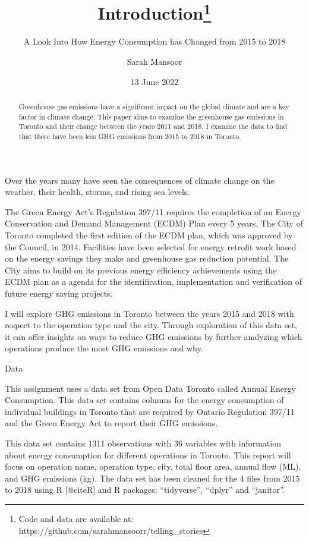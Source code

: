 \documentclass[
  letterpaper,
  DIV=11,
  numbers=noendperiod]{scrartcl}
\title{Introduction\thanks{Code and data are available at:
https://github.com/sarahmansoorr/telling\_stories}}
\subtitle{A Look Into How Energy Consumption has Changed from 2015 to
2018}
\author{Sarah Mansoor}
\date{13 June 2022}
\renewcommand*\contentsname{Table of contents}
\newcommand\contentsname{Table of contents}
\begin{document}
\maketitle
\begin{abstract}
Greenhouse gas emissions have a significant impact on the global climate
and are a key factor in climate change. This paper aims to examine the
greenhouse gas emissions in Toronto and their change between the years
2011 and 2018. I examine the data to find that there have been less GHG
emissions from 2015 to 2018 in Toronto.
\end{abstract}
\ifdefined\Shaded\renewenvironment{Shaded}{\begin{tcolorbox}[interior hidden, boxrule=0pt, enhanced, borderline west={3pt}{0pt}{shadecolor}, frame hidden, sharp corners, breakable]}{\end{tcolorbox}}\fi

\renewcommand*\contentsname{Table of contents}
{
\hypersetup{linkcolor=}
\setcounter{tocdepth}{3}
\tableofcontents
}
Over the years many have seen the consequences of climate change on the
weather, their health, storms, and rising sea levels.

The Green Energy Act's Regulation 397/11 requires the completion of an
Energy Conservation and Demand Management (ECDM) Plan every 5 years. The
City of Toronto completed the first edition of the ECDM plan, which was
approved by the Council, in 2014. Facilities have been selected for
energy retrofit work based on the energy savings they make and
greenhouse gas reduction potential. The City aims to build on its
previous energy efficiency achievements using the ECDM plan as a agenda
for the identification, implementation and verification of future energy
saving projects.

I will explore GHG emissions in Toronto between the years 2015 and 2018
with respect to the operation type and the city. Through exploration of
this data set, it can offer insights on ways to reduce GHG emissions by
further analyzing which operations produce the most GHG emissions and
why.

\pagebreak

Data

This assignment uses a data set from Open Data Toronto called Annual
Energy Consumption. This data set contains columns for the energy
consumption of individual buildings in Toronto that are required by
Ontario Regulation 397/11 and the Green Energy Act to report their GHG
emissions.

This data set contains 1311 observations with 36 variables with
information about energy consumption for different operations in
Toronto. This report will focus on operation name, operation type, city,
total floor area, annual flow (ML), and GHG emissions (kg). The data set
has been cleaned for the 4 files from 2015 to 2018 using R {[}@citeR{]}
and R packages: ``tidyverse'', ``dplyr'' and ``janitor''.
\end{document}
